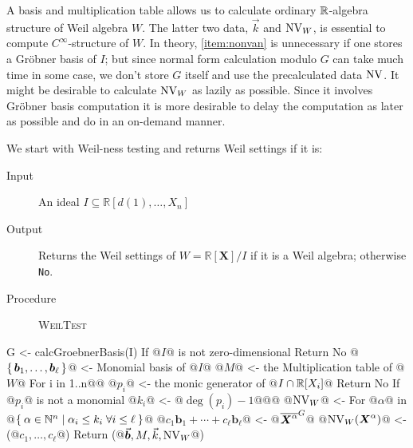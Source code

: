 \documentclass[%
  sigconf,authorversion,screen]{acmart}
\begin{document}
A basis and multiplication table allows us to calculate ordinary $\mathbb{R}$-algebra structure of Weil algebra $W$.
The latter two data, $\vec{k}$ and $\operatorname{NV}_W$, is essential to compute $C^\infty$-structure of $W$.
In theory, \ref{item:nonvan} is unnecessary if one stores a Gr\"{o}bner basis of $I$;
but since normal form calculation modulo $G$ can take much time in some case, we don't store $G$ itself and use the precalculated data $\operatorname{NV}$.
It might be desirable to calculate $\operatorname{NV}_W$ as lazily as possible.
Since it involves Gr\"{o}bner basis computation it is more desirable to delay the computation as later as possible and do in an on-demand manner.

We start with Weil-ness testing and returns Weil settings if it is:

\begin{algorithm}\label{alg:weil-test}
  \hspace{1em}\vspace{-.25em}
  \begin{description}
    \item[Input] An ideal $I \subseteq \mathbb{R}[d(1), \dots, X_n]$
    \item[Output] Returns the Weil settings of $W = \mathbb{R}[\boldsymbol{X}]/I$ if it is a Weil algebra; otherwise \verb|No|.
    \item[Procedure] \textup{\textsc{WeilTest}}
  \end{description}

  \begin{alg}
G <- calcGroebnerBasis(I)
If @$I$@ is not zero-dimensional
  Return No
@$\set{\boldsymbol{b}_1, \dots, \boldsymbol{b}_\ell}$@ <- Monomial basis of @$I$@
@$M$@ <- the Multiplication table of @$W$@
For i in 1..n@\label{line:weil-test:radical-start}@
  @$p_i$@ <- the monic generator of @$I \cap \mathbb{R}[X_i]$@
  Return No If @$p_i$@ is not a monomial
  @$k_i$@ <- @$\deg(p_i) - 1$@@\label{line:weil-test:radical-end}@
@$\operatorname{NV}_W$@ <- {}
For @$\alpha$@ in @$\Set{\alpha \in \mathbb{N}^n | \alpha_i \leq k_i \; \forall i \leq \ell}$@
  @$c_1 \boldsymbol{b}_1 + \cdots + c_\ell \boldsymbol{b}_\ell$@ <- @${\overline{\boldsymbol{X}^\alpha}}^{G}$@
  @$\operatorname{NV}_W(\boldsymbol{X}^\alpha)$@ <- (@$c_1, \dots, c_\ell$@)
Return (@$\vec{\boldsymbol{b}}, M, \vec{k}, \operatorname{NV}_W$@)
\end{alg}
\end{algorithm}
\end{document}
